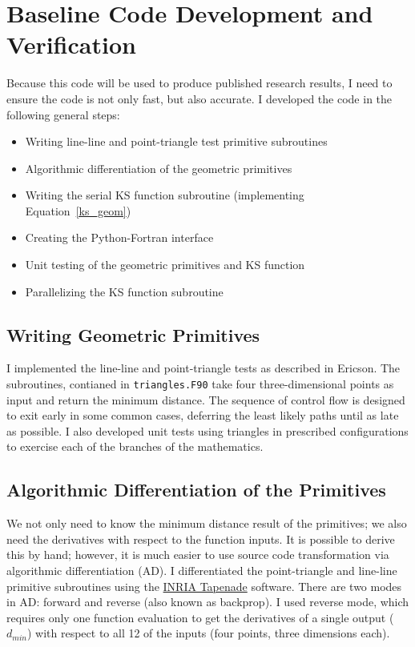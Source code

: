 \documentclass[11pt,letterpaper]{article}
\begin{document}
\section{Baseline Code Development and Verification}
\qquad Because this code will be used to produce published research results, I need to ensure the code is not only fast, but also accurate.
I developed the code in the following general steps:
\begin{itemize}
  \item Writing line-line and point-triangle test primitive subroutines
  \item Algorithmic differentiation of the geometric primitives
  \item Writing the serial KS function subroutine (implementing Equation~\ref{ks_geom})
  \item Creating the Python-Fortran interface
  \item Unit testing of the geometric primitives and KS function
  \item Parallelizing the KS function subroutine
\end{itemize}

\subsection{Writing Geometric Primitives}
\qquad I implemented the line-line and point-triangle tests as described in Ericson. %
The subroutines, contianed in \texttt{triangles.F90} take four three-dimensional points as input and return the minimum distance.
The sequence of control flow is designed to exit early in some common cases, deferring the least likely paths until as late as possible.
I also developed unit tests using triangles in prescribed configurations to exercise each of the branches of the mathematics.

\subsection{Algorithmic Differentiation of the Primitives}
\qquad We not only need to know the minimum distance result of the primitives; we also need the derivatives with respect to the function inputs.
It is possible to derive this by hand; however, it is much easier to use source code transformation via algorithmic differentiation (AD).
I differentiated the point-triangle and line-line primitive subroutines using the \href{https://www-sop.inria.fr/tropics/tapenade.html}{INRIA Tapenade} software.
There are two modes in AD: forward and reverse (also known as backprop).
I used reverse mode, which requires only one function evaluation to get the derivatives of a single output ($d_{min}$) with respect to all 12 of the inputs (four points, three dimensions each).
\end{document}
